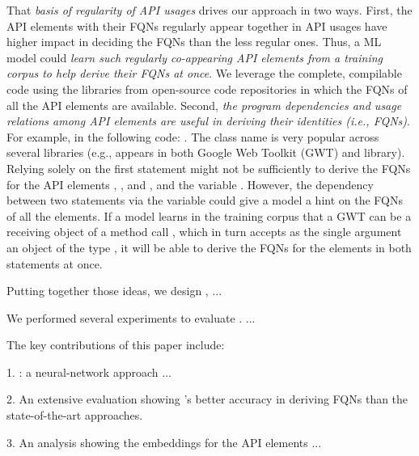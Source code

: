 That {\em basis of regularity of API usages} drives our approach in
two ways. First, the API elements with their FQNs regularly appear
together in API usages have higher impact in deciding the FQNs than
the less regular ones. Thus, a ML model could {\em learn such regularly
co-appearing API elements from a training corpus to help derive their
FQNs at once}. We leverage the complete, compilable code using the
libraries from open-source code repositories in which the FQNs of all
the API elements are available. Second, {\em the program dependencies and
usage relations among API elements are useful in deriving their
identities (i.e., FQNs)}. For example, in the following code:
 . The class name  is very popular
  across several libraries (e.g.,  appears in both Google
  Web Toolkit (GWT) and  library). Relying solely on the
  first statement might not be sufficiently to derive the FQNs for the
  API elements , , and
  , and the variable . However, the
   dependency between two statements via the variable
   could give a model a hint on the FQNs of all the elements.
  If a model learns in the training corpus that a GWT 
  can be a receiving object of a method call ,
  which in turn accepts as the single argument an object of the type
  , it will be able to derive the FQNs for the
  elements in both statements at once.

Putting together those ideas, we design {\tool}, ...

We performed several experiments to evaluate {\tool}. ...

The key contributions of this paper include:

1. {\tool}: a neural-network approach ...


2. An extensive evaluation showing {\tool}'s better accuracy in
deriving FQNs than the state-of-the-art approaches.

3. An analysis showing the embeddings for the API elements ...

